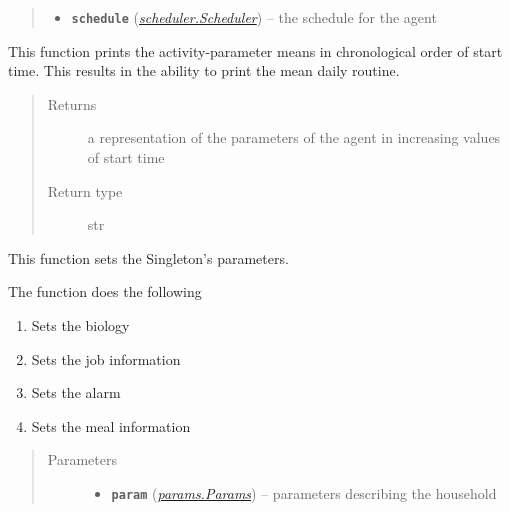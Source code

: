 \documentclass[letterpaper,10pt,english]{sphinxmanual}
\begin{document}
\begin{fulllineitems}
\begin{quote}
\begin{description}
\begin{itemize}
\item {} 
\textbf{\texttt{schedule}} ({\hyperref[scheduler:scheduler.Scheduler]{\emph{\emph{scheduler.Scheduler}}}}) -- the schedule for the agent

\end{itemize}

\end{description}\end{quote}

\begin{fulllineitems}
\label{singleton:singleton.Singleton.print_params}
This function prints the activity-parameter means in chronological order of start time. This         results in the ability to print the mean daily routine.
\begin{quote}\begin{description}
\item[{Returns}] \leavevmode
a representation of the parameters of the agent in increasing values of         start time

\item[{Return type}] \leavevmode
str

\end{description}\end{quote}

\end{fulllineitems}


\begin{fulllineitems}
\label{singleton:singleton.Singleton.set}
This function sets the Singleton's parameters.

The function does the following
\begin{enumerate}
\item {} 
Sets the biology

\item {} 
Sets the job information

\item {} 
Sets the alarm

\item {} 
Sets the meal information

\end{enumerate}
\begin{quote}\begin{description}
\item[{Parameters}] \leavevmode\begin{itemize}
\item {} 
\textbf{\texttt{param}} ({\hyperref[params:params.Params]{\emph{\emph{params.Params}}}}) -- parameters describing the household


\end{itemize}
\end{description}
\end{quote}
\end{fulllineitems}
\end{fulllineitems}
\end{document}
